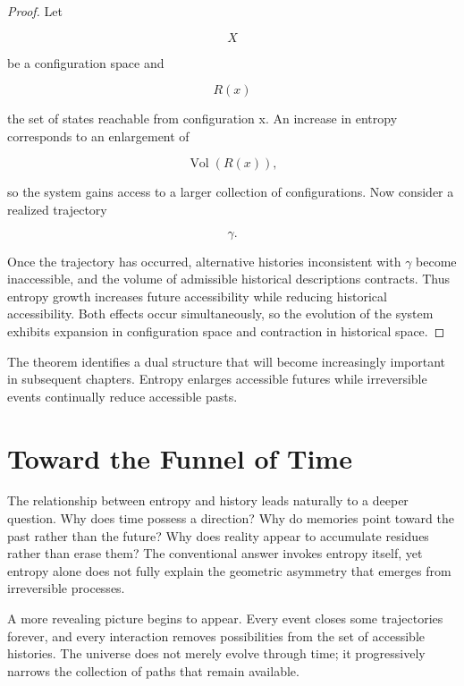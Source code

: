 \documentclass[11pt,oneside]{book}
\theoremstyle{plain}
\theoremstyle{definition}
\theoremstyle{remark}
\DeclareMathOperator{\Vol}{Vol}
\begin{document}
\begin{proof}
Let

\begin{equation}
X
\end{equation}

be a configuration space and

\begin{equation}
R(x)
\end{equation}

the set of states reachable from configuration x. An increase in entropy corresponds to an enlargement of

\begin{equation}
\Vol(R(x)),
\end{equation}

so the system gains access to a larger collection of configurations. Now consider a realized trajectory

\begin{equation}
\gamma.
\end{equation}

Once the trajectory has occurred, alternative histories inconsistent with \(\gamma\) become inaccessible, and the volume of admissible historical descriptions contracts. Thus entropy growth increases future accessibility while reducing historical accessibility. Both effects occur simultaneously, so the evolution of the system exhibits expansion in configuration space and contraction in historical space.
\end{proof}

The theorem identifies a dual structure that will become increasingly important in subsequent chapters. Entropy enlarges accessible futures while irreversible events continually reduce accessible pasts.

\section{Toward the Funnel of Time}

The relationship between entropy and history leads naturally to a deeper question. Why does time possess a direction? Why do memories point toward the past rather than the future? Why does reality appear to accumulate residues rather than erase them? The conventional answer invokes entropy itself, yet entropy alone does not fully explain the geometric asymmetry that emerges from irreversible processes.

A more revealing picture begins to appear. Every event closes some trajectories forever, and every interaction removes possibilities from the set of accessible histories. The universe does not merely evolve through time; it progressively narrows the collection of paths that remain available.
\end{document}
